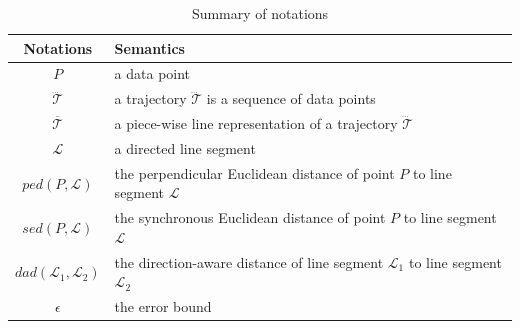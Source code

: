 \begin{table}
	\renewcommand{\arraystretch}{1.20}
	\vspace{-1ex}
	\caption{\small Summary of notations}
	\centering
	\scriptsize
	\begin{tabular}{|c|l|}
		\hline
		{\bf Notations}& {\bf Semantics}   \\		\hline %
		$P$ & a data point \\		\hline
		$\dddot{\mathcal{T}}$ & a trajectory $\dddot{\mathcal{T}}$ is a sequence of data points\\		\hline
		$\overline{\mathcal{T}}$&  {a piece-wise line representation of a trajectory $\dddot{\mathcal{T}}$}	\\		\hline
		$\mathcal{L}$ & a directed line segment  \\		\hline
		$ped\left(P, \mathcal{L}\right)$ &  {the perpendicular Euclidean distance of point $P$ to line segment $\mathcal{L}$}	\\	\hline
		$sed\left(P, \mathcal{L}\right)$ & {the synchronous Euclidean distance of point $P$ to line segment $\mathcal{L}$} 	\\		\hline
		$dad\left(\mathcal{L}_1, \mathcal{L}_2\right)$ & {the direction-aware distance of line segment $\mathcal{L}_1$ to line segment $\mathcal{L}_2$} 	\\		\hline
		$\epsilon$ & the error bound \\		\hline
	\end{tabular}
	\label{tab:notations}
	\vspace{-1ex}
\end{table}


